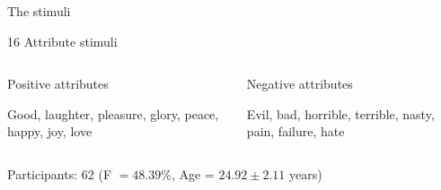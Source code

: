 \documentclass[compress]{beamer}
\begin{document}
\begin{frame}{The stimuli}
\begin{block}{16 Attribute stimuli}
	\begin{columns}[T]
	\begin{column}{.50\linewidth}
		\begin{center}
			\color{rasch}Positive attributes
		\end{center}
		
		Good, laughter, pleasure, glory, peace, happy, joy, love
	\end{column}
	
	\begin{column}{.50\linewidth}
		\begin{center}
			\color{alert}Negative attributes
		\end{center}
		
		Evil, bad, horrible, terrible, nasty, pain, failure, hate
	\end{column}
\end{columns}
	\end{block}
	\vspace{1.2mm}
	Participants: 62 (F $=48.39$\%, Age = $24.92\pm2.11$ years)

\end{frame}
\end{document}
